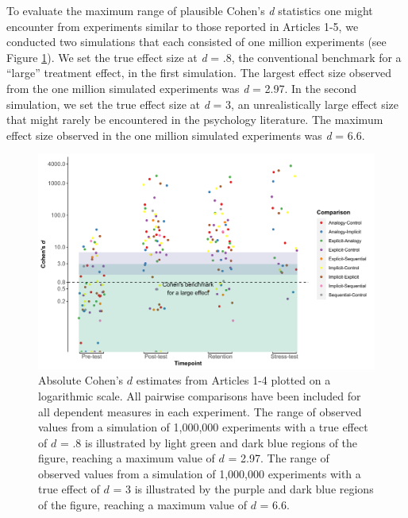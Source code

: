 \documentclass[
  english,
  man,floatsintext]{apa7}
\begin{document}
To evaluate the maximum range of plausible Cohen's \emph{d} statistics one might encounter from experiments similar to those reported in Articles 1-5, we conducted two simulations that each consisted of one million experiments (see Figure \ref{fig:fig1}). We set the true effect size at \emph{d} = .8, the conventional benchmark for a ``large'' treatment effect, in the first simulation. The largest effect size observed from the one million simulated experiments was \emph{d} = 2.97. In the second simulation, we set the true effect size at \emph{d} = 3, an unrealistically large effect size that might rarely be encountered in the psychology literature. The maximum effect size observed in the one million simulated experiments was \emph{d} = 6.6.



\begin{figure}

{\centering \includegraphics[width=1\linewidth,height=1\textheight]{../../figs/fig1} 

}

\caption{Absolute Cohen's \(d\) estimates from Articles 1-4 plotted on a logarithmic scale. All pairwise comparisons have been included for all dependent measures in each experiment. The range of observed values from a simulation of 1,000,000 experiments with a true effect of \(d\) = .8 is illustrated by light green and dark blue regions of the figure, reaching a maximum value of \(d\) = 2.97. The range of observed values from a simulation of 1,000,000 experiments with a true effect of \(d\) = 3 is illustrated by the purple and dark blue regions of the figure, reaching a maximum value of \(d\) = 6.6.}\label{fig:fig1}
\end{figure}
\end{document}
